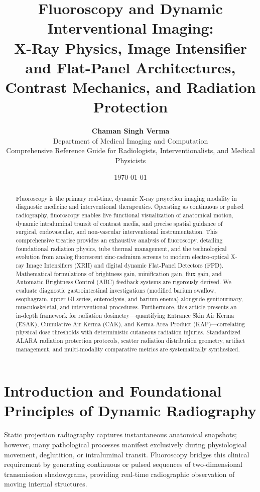 \documentclass[11pt,a4paper]{article}
\title{\textbf{\huge Fluoroscopy and Dynamic Interventional Imaging:}\\[0.3em]
\Large X-Ray Physics, Image Intensifier and Flat-Panel Architectures,\\
Contrast Mechanics, and Radiation Protection}
\author{\textbf{Chaman Singh Verma}\\[0.2em]
\small Department of Medical Imaging and Computation\\
\small \textsf{Comprehensive Reference Guide for Radiologists, Interventionalists, and Medical Physicists}}
\date{\today}
\begin{document}
\maketitle

\begin{abstract}
Fluoroscopy is the primary real-time, dynamic X-ray projection imaging modality in diagnostic medicine and interventional therapeutics. Operating as continuous or pulsed radiography, fluoroscopy enables live functional visualization of anatomical motion, dynamic intraluminal transit of contrast media, and precise spatial guidance of surgical, endovascular, and non-vascular interventional instrumentation. This comprehensive treatise provides an exhaustive analysis of fluoroscopy, detailing foundational radiation physics, tube thermal management, and the technological evolution from analog fluorescent zinc-cadmium screens to modern electro-optical X-ray Image Intensifiers (XRII) and digital dynamic Flat-Panel Detectors (FPD). Mathematical formulations of brightness gain, minification gain, flux gain, and Automatic Brightness Control (ABC) feedback systems are rigorously derived. We evaluate diagnostic gastrointestinal investigations (modified barium swallow, esophagram, upper GI series, enteroclysis, and barium enema) alongside genitourinary, musculoskeletal, and interventional procedures. Furthermore, this article presents an in-depth framework for radiation dosimetry—quantifying Entrance Skin Air Kerma (ESAK), Cumulative Air Kerma (CAK), and Kerma-Area Product (KAP)—correlating physical dose thresholds with deterministic cutaneous radiation injuries. Standardized ALARA radiation protection protocols, scatter radiation distribution geometry, artifact management, and multi-modality comparative metrics are systematically synthesized.
\end{abstract}

\tableofcontents
\newpage

\section{Introduction and Foundational Principles of Dynamic Radiography}

Static projection radiography captures instantaneous anatomical snapshots; however, many pathological processes manifest exclusively during physiological movement, deglutition, or intraluminal transit. Fluoroscopy bridges this clinical requirement by generating continuous or pulsed sequences of two-dimensional transmission shadowgrams, providing real-time radiographic observation of moving internal structures.
\end{document}
